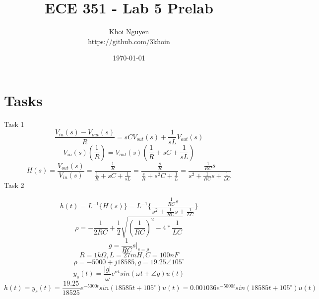 \documentclass[11pt,a4,titlepage]{article}
\title{ECE 351 - Lab 5 Prelab}
\author{Khoi Nguyen \\ https://github.com/3khoin}
\date{\today}
\begin{document}
\maketitle
\pagebreak

\section*{Tasks}
Task 1
\[\frac{V_{in}(s) - V_{out}(s)}{R} = sCV_{out}(s) + \frac{1}{sL}V_{out}(s)\]
\[V_{in}(s)(\frac{1}{R}) = V_{out}(s)(\frac{1}{R} + sC + \frac{1}{sL})\]
\[H(s) = \frac{V_{out}(s)}{V_{in}(s)} = \frac{\frac{1}{R}}{\frac{1}{R} + sC + \frac{1}{sL}} = \frac{\frac{s}{R}}{\frac{s}{R} + s^{2}C + \frac{1}{L}} = \frac{\frac{1}{RC}s}{s^{2} + \frac{1}{RC}s + \frac{1}{LC}}\]
Task 2

\[h(t) = L^{-1}\{H(s)\} = L^{-1}\{\frac{\frac{1}{RC}s}{s^{2} + \frac{1}{RC}s + \frac{1}{LC}}\}\]
\[\rho = -\frac{1}{2RC} + \frac{1}{2}\sqrt{(\frac{1}{RC})^2 - 4*\frac{1}{LC}}\]
\[g = \frac{1}{RC}s| _{s = \rho}\]
\[R = 1k\Omega, L = 27mH, C = 100nF\]
\[\rho = -5000 + j18585, g = 19.25\angle105^{\circ}\]
\[y_{s}(t) = \frac{|g|}{\omega}e^{\alpha t}sin(\omega t + \angle g)u(t)\]
\[h(t) = y_{s}(t) = \frac{19.25}{18525}e^{-5000t}sin(18585t + 105^{\circ})u(t) = 0.001036e^{-5000t}sin(18585t + 105^{\circ})u(t)\]
\end{document}
